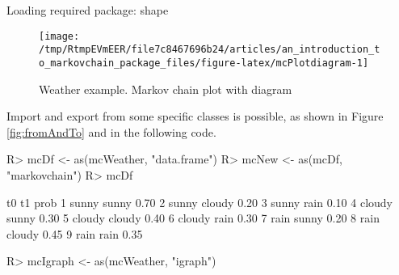 \documentclass[
  nojss]{jss}
\begin{document}
\begin{CodeChunk}

\begin{CodeOutput}
Loading required package: shape
\end{CodeOutput}
\begin{figure}

{\centering \texttt{[image: /tmp/RtmpEVmEER/file7c8467696b24/articles/an\_introduction\_to\_markovchain\_package\_files/figure-latex/mcPlotdiagram-1]} 

}

\caption[Weather example]{Weather example. Markov chain plot with diagram}\label{fig:mcPlotdiagram}
\end{figure}
\end{CodeChunk}

Import and export from some specific classes is possible, as shown in Figure \ref{fig:fromAndTo} and in the following code.

\begin{CodeChunk}

\begin{CodeInput}
R> mcDf <- as(mcWeather, "data.frame")
R> mcNew <- as(mcDf, "markovchain")
R> mcDf
\end{CodeInput}

\begin{CodeOutput}
      t0     t1 prob
1  sunny  sunny 0.70
2  sunny cloudy 0.20
3  sunny   rain 0.10
4 cloudy  sunny 0.30
5 cloudy cloudy 0.40
6 cloudy   rain 0.30
7   rain  sunny 0.20
8   rain cloudy 0.45
9   rain   rain 0.35
\end{CodeOutput}

\begin{CodeInput}
R> mcIgraph <- as(mcWeather, "igraph")
\end{CodeInput}
\end{CodeChunk}
\end{document}
